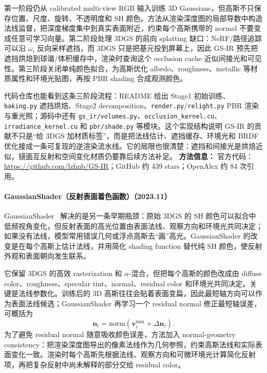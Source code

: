 第一阶段仍从 calibrated multi-view RGB 输入训练 3D Gaussians，但高斯不只保存位置、尺度、旋转、不透明度和 SH 颜色。方法从渲染深度图的局部导数中构造法线监督，把深度梯度集中到真实表面附近，约束每个高斯携带的 normal 不要变成任意可学习向量。第二阶段处理 3DGS 的前向 splatting 缺口：NeRF/路径追踪可以沿 $\omega_i$ 反向采样遮挡，而 3DGS 只是把基元投到屏幕上，因此 GS-IR 预先把遮挡烘焙到球谐/体积缓存中，渲染时查询这个 occlusion cache 近似间接光和可见性。第三阶段关闭单纯颜色拟合，为高斯优化 albedo、roughness、metallic 等材质属性和环境光贴图，再按 PBR shading 合成观测颜色。

代码仓库也能看到这条三阶段流程：README 给出 Stage1 初始训练、\texttt{baking.py} 遮挡烘焙、Stage2 decomposition、\texttt{render.py}/\texttt{relight.py} PBR 渲染与重光照；源码中还有 \texttt{gs\_ir/volumes.py}、\texttt{occlusion\_kernel.cu}、\texttt{irradiance\_kernel.cu} 和 \texttt{pbr/shade.py} 等模块。这个实现结构说明 GS-IR 的贡献不只是“给 3DGS 加材质标签”，而是把法线估计、遮挡缓存、环境光和 BRDF 优化接成一条可复现的逆渲染流水线。它的局限也很清楚：遮挡和间接光是烘焙近似，镜面互反射和空间变化材质仍要靠后续方法补足。
\textbf{方法信息：} 官方代码：\url{https://github.com/lzhnb/GS-IR}；GitHub 约 439 stars；OpenAlex 约 84 次引用。



\paragraph{GaussianShader（反射表面着色函数）（2023.11）}
GaussianShader~\cite{2311_17977} 解决的是另一条早期瓶颈：原始 3DGS 的 SH 颜色可以拟合中低频视角变化，但反射表面的高光位置由表面法线、观察方向和环境光共同决定；如果没有法线，模型常用错误几何或浮点高斯去“画”高光。GaussianShader 的改变是在每个高斯上估计法线，并用简化 shading function 替代纯 SH 颜色，使反射外观和表面朝向发生联系。

它保留 3DGS 的高效 rasterization 和 $\alpha$-混合，但把每个高斯的颜色改成由 diffuse color、roughness、specular tint、normal、residual color 和环境光共同决定。关键是法线参数化。训练后的 3D 高斯往往会贴着表面变扁，因此最短轴方向可以作为表面法线候选；GaussianShader 再学习一个 residual normal 修正最短轴误差，可概括为
\[
  \mathbf n_i=\mathrm{norm}\!\left(\mathbf v^{\min}_i+\Delta \mathbf n_i\right).
\]
为了避免 residual normal 随意吸收颜色误差，方法加入 normal-geometry consistency：把渲染深度图导出的像素法线作为几何参照，约束高斯法线和实际表面变化一致。渲染时每个高斯先根据法线、观察方向和可微环境光计算简化反射项，再把复杂反射中尚未解释的部分交给 residual color。


